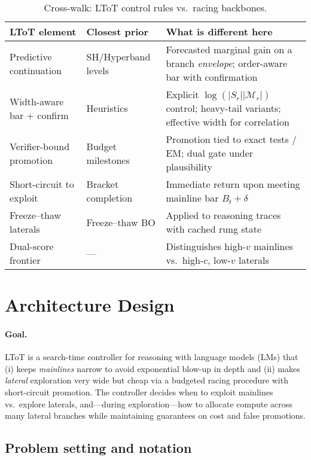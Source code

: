 \documentclass{article}
\begin{document}
\begin{table}[t]
\centering
\small
\begin{tabular}{@{}p{2.9cm}p{3.0cm}p{6.7cm}@{}}
\toprule
\textbf{LToT element} & \textbf{Closest prior} & \textbf{What is different here} \\
\midrule
Predictive continuation & SH/Hyperband levels & Forecasted marginal gain on a branch \emph{envelope}; order-aware bar with confirmation \\
Width-aware bar + confirm & Heuristics & Explicit $\log(|S_r||\mathcal{M}_r|)$ control; heavy-tail variants; effective width for correlation \\
Verifier-bound promotion & Budget milestones & Promotion tied to exact tests / EM; dual gate under plausibility \\
Short-circuit to exploit & Bracket completion & Immediate return upon meeting mainline bar $B_t+\delta$ \\
Freeze--thaw laterals & Freeze--thaw BO & Applied to reasoning traces with cached rung state \\
Dual-score frontier & --- & Distinguishes high-$v$ mainlines vs.\ high-$c$, low-$v$ laterals \\
\bottomrule
\end{tabular}
\caption{Cross-walk: LToT control rules vs.\ racing backbones.}
\end{table}
\section{Architecture Design}
\label{section:architecture-design}

\paragraph{Goal.}
LToT is a search-time controller for reasoning with language models (LMs) that
(i) keeps \emph{mainlines} narrow to avoid exponential blow-up in depth and
(ii) makes \emph{lateral} exploration very wide but cheap via a budgeted racing procedure with short-circuit promotion.
The controller decides when to exploit mainlines vs.\ explore laterals, and—during exploration—how to allocate compute across many lateral branches while maintaining guarantees on cost and false promotions.

\vspace{0.5em}
\subsection{Problem setting and notation}
\end{document}
